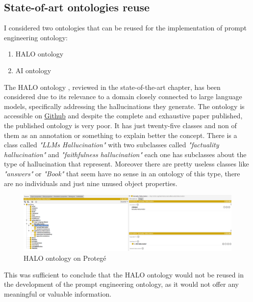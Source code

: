 \subsection{State-of-art ontologies reuse}
I considered two ontologies that can be reused for the implementation of prompt engineering ontology:
\begin{enumerate}
    \item HALO ontology

    \item AI ontology
\end{enumerate}
The HALO ontology \cite{nananukul2024halo}, reviewed in the state-of-the-art chapter, has been considered due to its relevance to a domain closely connected to large language models, specifically addressing the hallucinations they generate. The ontology is accessible on \href{https://github.com/navapatn/halo-ontology}{Github} and despite the complete and exhaustive paper published, the published ontology is very poor. It has just twenty-five classes and non of them as an annotation or something to explain better the concept. There is a class called \textit{"LLMs Hallucination"} with two subclasses called \textit{"factuality hallucination"} and \textit{"faithfulness hallucination"} each one has subclasses about the type of hallucination that represent. Moreover there are pretty useless classes like \textit{"answers"} or \textit{"Book"} that seem have no sense in an ontology of this type, there are no individuals and just nine unused object properties. 
\begin{figure}[H]
    \centering
    \includegraphics[width=1.0\linewidth]{Figures/fig_28.png}
    \caption{HALO ontology on Protegé}
    \label{fig:enter-label}
\end{figure}
This was sufficient to conclude that the HALO ontology would not be reused in the development of the prompt engineering ontology, as it would not offer any meaningful or valuable information.\\
